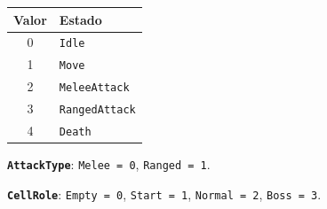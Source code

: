 \documentclass[a4paper,12pt]{article}
\newcommand{\code}[1]{\texttt{#1}}
\begin{document}
\begin{center}
\begin{tabular}{|c|l|}
\hline
\textbf{Valor} & \textbf{Estado} \\
\hline
0 & \code{Idle} \\
\hline
1 & \code{Move} \\
\hline
2 & \code{MeleeAttack} \\
\hline
3 & \code{RangedAttack} \\
\hline
4 & \code{Death} \\
\hline
\end{tabular}
\end{center}

\textbf{\code{AttackType}}: \code{Melee = 0}, \code{Ranged = 1}.

\textbf{\code{CellRole}}: \code{Empty = 0}, \code{Start = 1}, \code{Normal = 2}, \code{Boss = 3}.
\end{document}

